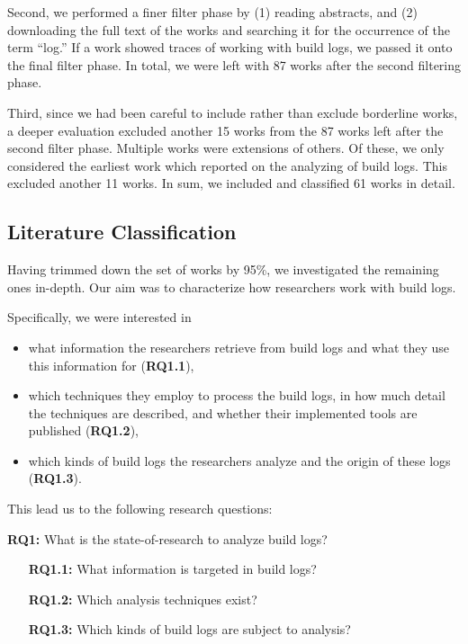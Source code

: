 \documentclass[10pt,journal,compsoc]{IEEEtran}
\begin{document}
Second, we performed a finer filter phase by (1) reading abstracts,
and (2) downloading the
full text of the works and searching it
for the occurrence of the term ``log.''
If a work showed traces of
working with build logs, we passed it onto the final filter phase.
In total, we
were left with 87 works after the second filtering phase.

Third, since we had been careful to include rather than exclude borderline
works, a deeper evaluation excluded another 15 works from the 87
works left after the second filter phase.
Multiple works were extensions of others.
Of these, we only considered the earliest work which reported on
the analyzing of build logs.
This excluded another 11 works.
In sum, we included and classified 61 works in detail.

\subsection{Literature Classification}
Having trimmed down the set of works by 95\%, we investigated the
remaining ones in-depth.
Our aim was to characterize how researchers work with build logs.

Specifically, we were interested in
\begin{itemize}
  \item what information the researchers retrieve from build logs and
  what they use this information for (\textbf{RQ1.1}),
  \item which techniques they employ to process the build logs,
  in how much detail the techniques are described,
	and whether their implemented tools are published
  (\textbf{RQ1.2}),
  \item which kinds of build logs the researchers analyze
	and the origin of these logs (\textbf{RQ1.3}).
\end{itemize}

This lead us to the following research questions:
\begin{simplebox}[attach boxed title to top center={yshift=-6mm}]
{\textbf{RQ1:} What is the state-of-research to analyze build logs?}
\begin{itemize}[leftmargin=1cm]
  \item[\textbf{RQ1.1:}] What information is targeted in build logs?
  \item[\textbf{RQ1.2:}] Which analysis techniques exist?
  \item[\textbf{RQ1.3:}] Which kinds of build logs are subject to
  analysis?
\end{itemize}
\end{simplebox}
\end{document}

